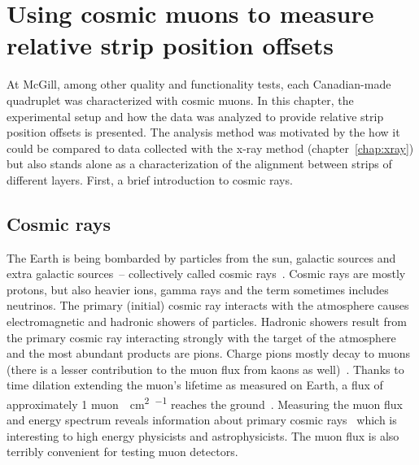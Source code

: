 
\chapter{Using cosmic muons to measure relative strip position offsets}
\label{chap:cosmics}

At McGill, among other quality and functionality tests, each Canadian-made quadruplet was characterized with cosmic muons. In this chapter, the experimental setup and how the data was analyzed to provide relative strip position offsets is presented. The analysis method was motivated by the how it could be compared to data collected with the x-ray method (chapter~\ref{chap:xray}) but also stands alone as a characterization of the alignment between strips of different layers. First, a brief introduction to cosmic rays.

\section{Cosmic rays}

The Earth is being bombarded by particles from the sun, galactic sources and extra galactic sources~-- collectively called cosmic rays~\cite{boezio_chemical_2012, zyla_review_2020}. Cosmic rays are mostly protons, but also heavier ions, gamma rays and the term sometimes includes neutrinos. The primary (initial) cosmic ray interacts with the atmosphere causes electromagnetic and hadronic showers of particles. Hadronic showers result from the primary cosmic ray interacting strongly with the target of the atmosphere and the most abundant products are pions. Charge pions mostly decay to muons (there is a lesser contribution to the muon flux from kaons as well)~\cite{grieder_cosmic_2001}. Thanks to time dilation extending the muon's lifetime as measured on Earth, a flux of approximately 1 muon\SI{}{\per\cm\squared\per\min} reaches the ground~\cite{zyla_review_2020}. Measuring the muon flux and energy spectrum reveals information about primary cosmic rays~\cite{grieder_cosmic_2001} which is interesting to high energy physicists and astrophysicists. The muon flux is also terribly convenient for testing muon detectors.

